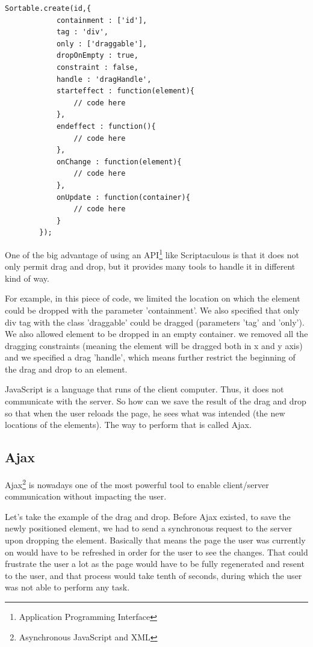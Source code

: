  \lstset{language=Javascript}
\begin{lstlisting}[label=scriptaculous,caption=Drag And Dropping with scriptaculous]
Sortable.create(id,{
			containment : ['id'],
			tag : 'div',
			only : ['draggable'],
			dropOnEmpty : true,
			constraint : false,
			handle : 'dragHandle',
			starteffect : function(element){
				// code here
			},
			endeffect : function(){
				// code here
			},
			onChange : function(element){
				// code here
			},
			onUpdate : function(container){	
				// code here
			}
		});
\end{lstlisting}

One of the big advantage of using an API\footnote{Application Programming Interface} like Scriptaculous is that it does not only permit drag and drop, but it provides many tools to handle it in different kind of way. 

For example, in this piece of code, we limited the location on which the element could be dropped with the parameter 'containment'. We also specified that only div tag with the class 'draggable' could be dragged (parameters 'tag' and 'only'). We also allowed element to be dropped in an empty container. we removed all the dragging constraints (meaning the element will be dragged both in x and y axis) and we specified a drag 'handle', which means further restrict the beginning of the drag and drop to an element.

JavaScript is a language that runs of the client computer. Thus, it does not communicate with the server. So how can we save the result of the drag and drop so that when the user reloads the page, he sees what was intended (the new locations of the elements). The way to perform that is called Ajax.

\subsection{Ajax}

Ajax\footnote{Asynchronous JavaScript and XML} is nowadays one of the most powerful tool to enable client/server communication without impacting the user. 

Let's take the example of the drag and drop. Before Ajax existed, to save the newly positioned element, we had to send a synchronous request to the server upon dropping the element. Basically that means the page the user was currently on would have to be refreshed in order for the user to see the changes. That could frustrate the user a lot as the page would have to be fully regenerated and resent to the user, and that process would take tenth of seconds, during which the user was not able to perform any task. 


